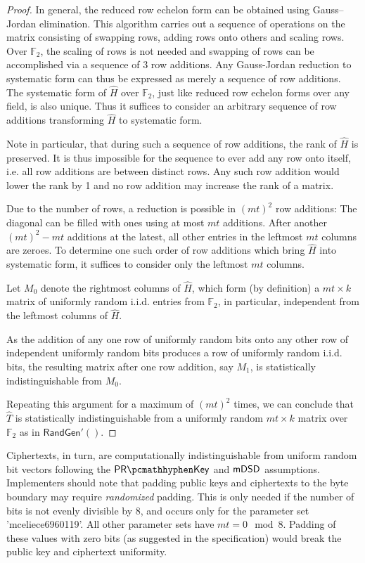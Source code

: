 \begin{proof}
    In general, the reduced row echelon form can be obtained using Gauss–Jordan elimination. This algorithm carries out a sequence of operations on the matrix consisting of swapping rows, adding rows onto others and scaling rows.
    Over $\mathbb F_2$, the scaling of rows is not needed and swapping of rows can be accomplished via a sequence of 3 row additions. Any Gauss-Jordan reduction to systematic form can thus be expressed as merely a sequence of row additions.
    The systematic form of $\hat H$ over $\mathbb F_2$, just like reduced row echelon forms over any field, is also unique. Thus it suffices to consider an arbitrary sequence of row additions transforming $\hat H$ to systematic form.

    Note in particular, that during such a sequence of row additions, the rank of $\hat H$ is preserved. It is thus impossible for the sequence to ever add any row onto itself, i.e. all row additions are between distinct rows. Any such row addition would lower the rank by 1 and no row addition may increase the rank of a matrix.
    
    Due to the number of rows, a reduction is possible in $(mt)^2$ row additions: The diagonal can be filled with ones using at most $mt$ additions. After another $(mt)^2-mt$ additions at the latest, all other entries in the leftmost $mt$ columns are zeroes. To determine one such order of row additions which bring $\hat H$ into systematic form, it suffices to consider only the leftmost $mt$ columns.
    
    Let $M_0$ denote the rightmost columns of $\hat H$, which form (by definition) a $mt \times k$ matrix of uniformly random i.i.d. entries from $\mathbb F_2$, in particular, independent from the leftmost columns of $\hat H$.
    
    As the addition of any one row of uniformly random bits onto any other row of independent uniformly random bits produces a row of uniformly random i.i.d. bits, the resulting matrix after one row addition, say $M_1$, is statistically indistinguishable from $M_0$.
    
    Repeating this argument for a maximum of $(mt)^2$ times, we can conclude that $\hat T$ is statistically indistinguishable from a uniformly random $mt \times k$ matrix over $\mathbb F_2$ as in $\textsf{RandGen}'()$.
\end{proof}

Ciphertexts, in turn, are computationally indistinguishable from uniform random bit vectors following the $\prkey$ and $\mathsf{mDSD}$ assumptions. Implementers should note that padding public keys and ciphertexts to the byte boundary may require \emph{randomized} padding. This is only needed if the number of bits is not evenly divisible by 8, and occurs only for the parameter set 'mceliece6960119'.  All other parameter sets have $mt = 0 \mod 8$. Padding of these values with zero bits (as suggested in the specification) would break the public key and ciphertext uniformity.

